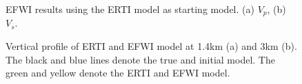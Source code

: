 \begin{figure}[!htb]
   \centering
   \caption{
	   EFWI results using the ERTI model as starting model. (a) $V_p$, (b) $V_s$.
   }
   \label{fig:EWERTI+EFWI}
\end{figure}
\begin{figure}[!htb]
   \centering
   \caption{
	   Vertical profile of ERTI and EFWI model at 1.4km (a) and 3km (b).
	   The black and blue lines denote the true and initial model. The green and yellow denote
	   the ERTI and EFWI model.
   }
   \label{fig:Profiles}
\end{figure}

